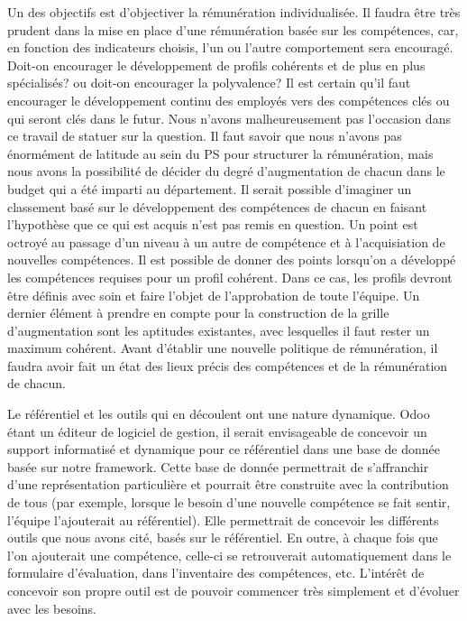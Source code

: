 \begin{description}
    Un des objectifs est d'objectiver la rémunération individualisée. Il faudra être très prudent dans la mise en place d'une rémunération basée sur les compétences, car, en fonction des indicateurs choisis, l'un ou l'autre comportement sera encouragé. Doit-on encourager le développement de profils cohérents et de plus en plus spécialisés? ou doit-on encourager la polyvalence? Il est certain qu'il faut encourager le développement continu des employés vers des compétences clés ou qui seront clés dans le futur. Nous n'avons malheureusement pas l'occasion dans ce travail de statuer sur la question. Il faut savoir que nous n'avons pas énormément de latitude au sein du PS pour structurer la rémunération, mais nous avons la possibilité de décider du degré d'augmentation de chacun dans le budget qui a été imparti au département. Il serait possible d'imaginer un classement basé sur le développement des compétences de chacun en faisant l'hypothèse que ce qui est acquis n'est pas remis en question. Un point est octroyé au passage d'un niveau à un autre de compétence et à l'acquisiation de nouvelles compétences. Il est possible de donner des points lorsqu'on a développé les compétences requises pour un profil cohérent. Dans ce cas, les profils devront être définis avec soin et faire l'objet de l'approbation de toute l'équipe. Un dernier élément à prendre en compte pour la construction de la grille d'augmentation sont les aptitudes existantes, avec lesquelles il faut rester un maximum cohérent. Avant d'établir une nouvelle politique de rémunération, il faudra avoir fait un état des lieux précis des compétences et de la rémunération de chacun.
    
    \end{description}
    
    Le référentiel et les outils qui en découlent ont une nature dynamique. Odoo étant un éditeur de logiciel de gestion, il serait envisageable de concevoir un support informatisé et dynamique pour ce référentiel dans une base de donnée basée sur notre framework. Cette base de donnée permettrait de s'affranchir d'une représentation particulière et pourrait être construite avec la contribution de tous (par exemple, lorsque le besoin d'une nouvelle compétence se fait sentir, l'équipe l'ajouterait au référentiel). Elle permettrait de concevoir les différents outils que nous avons cité, basés sur le référentiel. En outre, à chaque fois que l'on ajouterait une compétence, celle-ci se retrouverait automatiquement dans le formulaire d'évaluation, dans l'inventaire des compétences, etc. L'intérêt de concevoir son propre outil est de pouvoir commencer très simplement et d'évoluer avec les besoins. 



